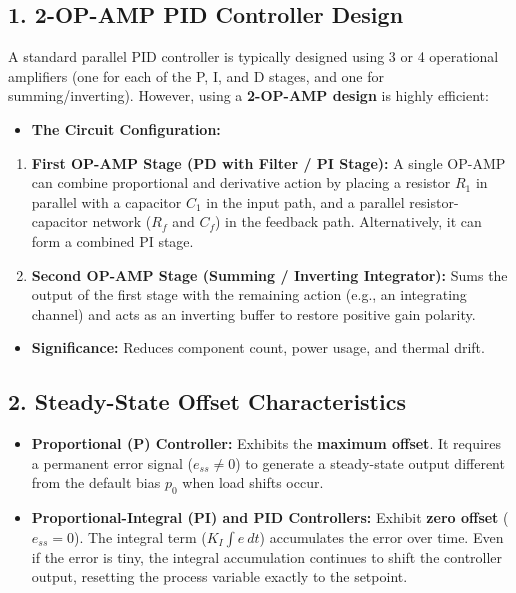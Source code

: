 \subsection{1. 2-OP-AMP PID Controller Design}
A standard parallel PID controller is typically designed using 3 or 4 operational amplifiers (one for each of the P, I, and D stages, and one for summing/inverting). However, using a \textbf{2-OP-AMP design} is highly efficient:
\begin{itemize}
  \item   \textbf{The Circuit Configuration:}
\end{itemize}
\begin{enumerate}
  \item \textbf{First OP-AMP Stage (PD with Filter / PI Stage):} A single OP-AMP can combine proportional and derivative action by placing a resistor $R_1$ in parallel with a capacitor $C_1$ in the input path, and a parallel resistor-capacitor network ($R_f$ and $C_f$) in the feedback path. Alternatively, it can form a combined PI stage.
  \item \textbf{Second OP-AMP Stage (Summing / Inverting Integrator):} Sums the output of the first stage with the remaining action (e.g., an integrating channel) and acts as an inverting buffer to restore positive gain polarity.
\end{enumerate}
\begin{itemize}
  \item   \textbf{Significance:} Reduces component count, power usage, and thermal drift.
\end{itemize}

\subsection{2. Steady-State Offset Characteristics}
\begin{itemize}
  \item   \textbf{Proportional (P) Controller:} Exhibits the \textbf{maximum offset}. It requires a permanent error signal ($e_{ss} \ne 0$) to generate a steady-state output different from the default bias $p_0$ when load shifts occur.
  \item   \textbf{Proportional-Integral (PI) and PID Controllers:} Exhibit \textbf{zero offset} ($e_{ss} = 0$). The integral term ($K_I \int e\ dt$) accumulates the error over time. Even if the error is tiny, the integral accumulation continues to shift the controller output, resetting the process variable exactly to the setpoint.
\end{itemize}

